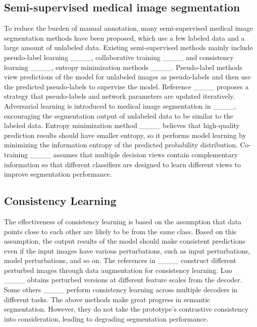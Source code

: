 \subsection{Semi-supervised medical image segmentation}
To reduce the burden of manual annotation, many semi-supervised medical image segmentation methods have been proposed, which use a few labeled data and a large amount of unlabeled data. Existing semi-supervised methods mainly include pseudo-label learning ____, collaborative training ____ and consistency learning ____, entropy minimization methods ____. Pseudo-label methods view predictions of the model for unlabeled images as pseudo-labels and then use the predicted pseudo-labels to supervise the model. 
Reference ____ proposes a strategy that pseudo-labels and network parameters are updated iteratively. Adversarial learning is introduced to medical image segmentation in ____, encouraging the segmentation output of unlabeled data to be similar to the labeled data. Entropy minimization method ____ believes that high-quality prediction results should have smaller entropy, so it performs model learning by minimizing the information entropy of the predicted probability distribution. Co-training ____ assumes that multiple decision views contain complementary information so that different classifiers are designed to learn different views to improve segmentation performance.



\subsection{Consistency Learning}
The effectiveness of consistency learning is based on the assumption that data points close to each other are likely to be from the same class. Based on this assumption, the output results of the model should make consistent predictions even if the input images have various perturbations, such as input perturbations, model perturbations, and so on.
The references in ____ construct different perturbed images through data augmentation for consistency learning. Luo ____  obtains perturbed versions at different feature scales from the decoder. Some others ____  perform consistency learning across multiple decoders in different tasks. The above methods make great progress in semantic segmentation. However, they do not take the prototype's contrastive consistency into consideration, leading to degrading segmentation performance.